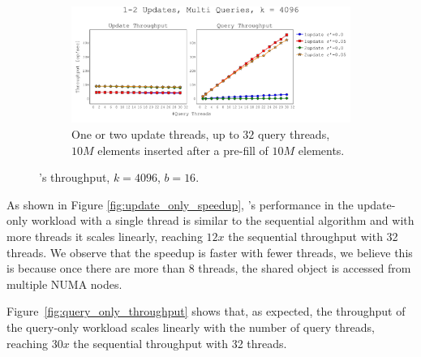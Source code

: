 \begin{figure}[h]
    \begin{subfigure}[]{\textwidth}
        \centering
        \hspace{5pt}
        \includegraphics[width=\textwidth,trim={0cm 0cm 0cm 1cm},clip]
        {graphics/graphs/throughput/oracle_Quancurrent_blocking_numa_update_query_k_4096_b16_keys10M_pre10M_preT1_runs15_Tu1-2_Tq2-30_snapshot1_rho_1_0-05_united_16-08-2022_07-09-08.pdf}
        \caption{One or two update threads, up to $32$ query threads, $10M$ elements inserted after a pre-fill of $10M$ elements.}
        \label{fig:mixed_throughput}
    \end{subfigure}
    \caption{\mysketch's throughput, $k=4096$, $b=16$.}
    \label{fig:throughput}
\end{figure}


As shown in Figure \ref{fig:update_only_speedup}, \mysketch's performance in the update-only workload with a single thread is similar to the sequential algorithm and with more threads it scales linearly, reaching $12x$ the sequential throughput with 32 threads. 
We observe that the speedup is faster with fewer threads, we believe this is because once there are more than $8$ threads, the shared object is accessed from multiple NUMA nodes.


Figure~\ref{fig:query_only_throughput} shows that, as expected, the throughput of the query-only workload scales linearly with the number of query threads, reaching $30x$ the sequential throughput with 32 threads.


